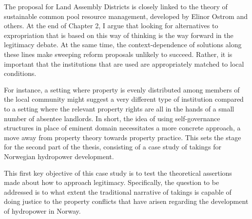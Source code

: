 The proposal for Land Assembly Districts is closely linked to the theory of sustainable common pool resource management, developed by Elinor Ostrom and others. At the end of Chapter 2, I argue that looking for alternatives to expropriation that is based on this way of thinking is the way forward in the legitimacy debate. At the same time, the context-dependence of solutions along these lines make sweeping reform proposals unlikely to succeed. Rather, it is important that the institutions that are used are appropriately matched to local conditions. 

For instance, a setting where property is evenly distributed among members of the local community might suggest a very different type of institution compared to a setting where the relevant property rights are all in the hands of a small number of absentee landlords. In short, the idea of using self-governance structures in place of eminent domain necessitates a more concrete approach, a move away from property theory towards property practice. This sets the stage for the second part of the thesis, consisting of a case study of takings for Norwegian hydropower development. 

This first key objective of this case study is to test the theoretical assertions made about how to approach legitimacy. Specifically, the question to be addressed is to what extent the traditional narrative of takings is capable of doing justice to the property conflicts that have arisen regarding the development of hydropower in Norway.

